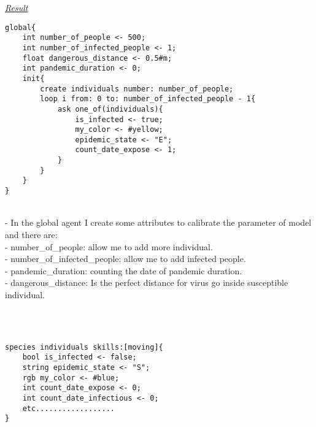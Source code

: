 \documentclass{article}
\begin{document}
\raggedright{\underline{\emph{Result}}}\\
\begin{tcolorbox}
\begin{lstlisting}
global{	
	int number_of_people <- 500;
	int number_of_infected_people <- 1;
	float dangerous_distance <- 0.5#m;
	int pandemic_duration <- 0;
	init{
		create individuals number: number_of_people;
		loop i from: 0 to: number_of_infected_people - 1{
			ask one_of(individuals){
				is_infected <- true;
				my_color <- #yellow;
				epidemic_state <- "E";
				count_date_expose <- 1;
			}
		}
	}
}
\end{lstlisting}
\end{tcolorbox}
\\
- In the global agent I create some attributes to calibrate the parameter of model and there are:
\\
- number\_of\_people: allow me to add more individual.
\\
- number\_of\_infected\_people: allow me to add infected people.
\\
- pandemic\_duration: counting the date of pandemic duration.
\\
- dangerous\_distance: Is the perfect distance for virus go inside susceptible individual.
\begin{tcolorbox}
\\\\
\begin{lstlisting}
species individuals skills:[moving]{
	bool is_infected <- false;
	string epidemic_state <- "S";
	rgb my_color <- #blue;
	int count_date_expose <- 0;
	int count_date_infectious <- 0;
	etc..................
}
\end{lstlisting}
\end{tcolorbox}
\newpage
\end{document}
